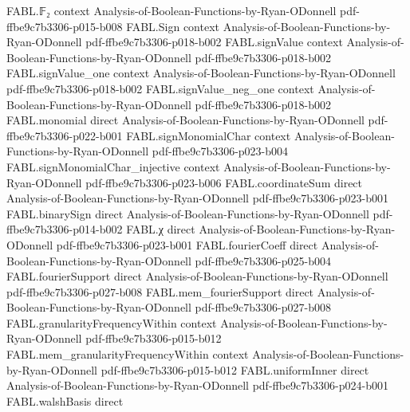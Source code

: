 \begin{theorem}
\label{FABL.dual_plancherel}
\leanok
{}
\proofstep
  {FABL.𝔽₂}
  {context}
  {Analysis-of-Boolean-Functions-by-Ryan-ODonnell}
  {pdf-ffbe9c7b3306-p015-b008}
\proofstep
  {FABL.Sign}
  {context}
  {Analysis-of-Boolean-Functions-by-Ryan-ODonnell}
  {pdf-ffbe9c7b3306-p018-b002}
\proofstep
  {FABL.signValue}
  {context}
  {Analysis-of-Boolean-Functions-by-Ryan-ODonnell}
  {pdf-ffbe9c7b3306-p018-b002}
\proofstep
  {FABL.signValue_one}
  {context}
  {Analysis-of-Boolean-Functions-by-Ryan-ODonnell}
  {pdf-ffbe9c7b3306-p018-b002}
\proofstep
  {FABL.signValue_neg_one}
  {context}
  {Analysis-of-Boolean-Functions-by-Ryan-ODonnell}
  {pdf-ffbe9c7b3306-p018-b002}
\proofstep
  {FABL.monomial}
  {direct}
  {Analysis-of-Boolean-Functions-by-Ryan-ODonnell}
  {pdf-ffbe9c7b3306-p022-b001}
\proofstep
  {FABL.signMonomialChar}
  {context}
  {Analysis-of-Boolean-Functions-by-Ryan-ODonnell}
  {pdf-ffbe9c7b3306-p023-b004}
\proofstep
  {FABL.signMonomialChar_injective}
  {context}
  {Analysis-of-Boolean-Functions-by-Ryan-ODonnell}
  {pdf-ffbe9c7b3306-p023-b006}
\proofstep
  {FABL.coordinateSum}
  {direct}
  {Analysis-of-Boolean-Functions-by-Ryan-ODonnell}
  {pdf-ffbe9c7b3306-p023-b001}
\proofstep
  {FABL.binarySign}
  {direct}
  {Analysis-of-Boolean-Functions-by-Ryan-ODonnell}
  {pdf-ffbe9c7b3306-p014-b002}
\proofstep
  {FABL.χ}
  {direct}
  {Analysis-of-Boolean-Functions-by-Ryan-ODonnell}
  {pdf-ffbe9c7b3306-p023-b001}
\proofstep
  {FABL.fourierCoeff}
  {direct}
  {Analysis-of-Boolean-Functions-by-Ryan-ODonnell}
  {pdf-ffbe9c7b3306-p025-b004}
\proofstep
  {FABL.fourierSupport}
  {direct}
  {Analysis-of-Boolean-Functions-by-Ryan-ODonnell}
  {pdf-ffbe9c7b3306-p027-b008}
\proofstep
  {FABL.mem_fourierSupport}
  {direct}
  {Analysis-of-Boolean-Functions-by-Ryan-ODonnell}
  {pdf-ffbe9c7b3306-p027-b008}
\proofstep
  {FABL.granularityFrequencyWithin}
  {context}
  {Analysis-of-Boolean-Functions-by-Ryan-ODonnell}
  {pdf-ffbe9c7b3306-p015-b012}
\proofstep
  {FABL.mem_granularityFrequencyWithin}
  {context}
  {Analysis-of-Boolean-Functions-by-Ryan-ODonnell}
  {pdf-ffbe9c7b3306-p015-b012}
\proofstep
  {FABL.uniformInner}
  {direct}
  {Analysis-of-Boolean-Functions-by-Ryan-ODonnell}
  {pdf-ffbe9c7b3306-p024-b001}
\proofstep
  {FABL.walshBasis}
  {direct}

\end{theorem}
